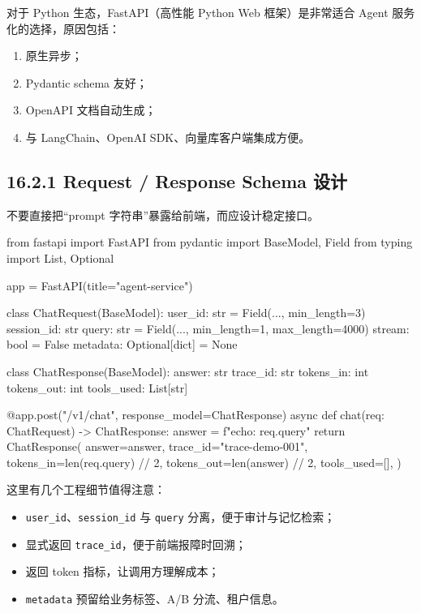 对于 Python 生态，FastAPI（高性能 Python Web 框架）是非常适合 Agent 服务化的选择，原因包括：


\begin{enumerate}[leftmargin=2em]
\item 原生异步；
\item Pydantic schema 友好；
\item OpenAPI 文档自动生成；
\item 与 LangChain、OpenAI SDK、向量库客户端集成方便。
\end{enumerate}

\subsection{16.2.1 Request / Response Schema 设计}

不要直接把``prompt 字符串''暴露给前端，而应设计稳定接口。


\begin{codeblock}
from fastapi import FastAPI
from pydantic import BaseModel, Field
from typing import List, Optional

app = FastAPI(title="agent-service")

class ChatRequest(BaseModel):
    user_id: str = Field(..., min_length=3)
    session_id: str
    query: str = Field(..., min_length=1, max_length=4000)
    stream: bool = False
    metadata: Optional[dict] = None

class ChatResponse(BaseModel):
    answer: str
    trace_id: str
    tokens_in: int
    tokens_out: int
    tools_used: List[str]

@app.post("/v1/chat", response_model=ChatResponse)
async def chat(req: ChatRequest) -> ChatResponse:
    answer = f"echo: {req.query}"
    return ChatResponse(
        answer=answer,
        trace_id="trace-demo-001",
        tokens_in=len(req.query) // 2,
        tokens_out=len(answer) // 2,
        tools_used=[],
    )
\end{codeblock}

这里有几个工程细节值得注意：


\begin{itemize}[leftmargin=2em]
\item \texttt{user\_id}、\texttt{session\_id} 与 \texttt{query} 分离，便于审计与记忆检索；
\item 显式返回 \texttt{trace\_id}，便于前端报障时回溯；
\item 返回 token 指标，让调用方理解成本；
\item \texttt{metadata} 预留给业务标签、A/B 分流、租户信息。
\end{itemize}

